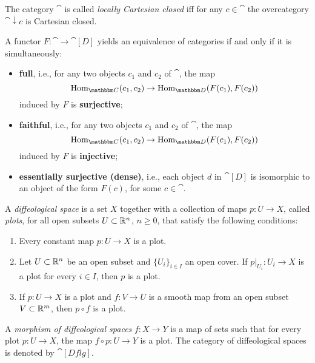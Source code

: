 \documentclass[a4paper,11pt]{article}  %
\newcommand{\Dflg}{\cat[Dflg]}
\begin{document}
\begin{definition}
	The category $\cat$ is called \emph{locally Cartesian closed} iff for any $c \in\cat$ the overcategory $\cat \downarrow c$ is Cartesian closed.
\end{definition}

\begin{definition}
A functor \( F : \cat \to \cat[D] \) yields an equivalence of categories if and only if it is simultaneously:
\begin{itemize}
    \item \textbf{full}, i.e., for any two objects \( c_1 \) and \( c_2 \) of \(\cat\), the map 
    \[
    \Hom_{\cat}(c_1, c_2) \to \Hom_{\cat[D]}(F(c_1), F(c_2))
    \]
    induced by \( F \) is \textbf{surjective};
    
    \item \textbf{faithful}, i.e., for any two objects \( c_1 \) and \( c_2 \) of \(\cat\), the map 
    \[
    \Hom_{\cat}(c_1, c_2) \to \Hom_{\cat[D]}(F(c_1), F(c_2))
    \]
    induced by \( F \) is \textbf{injective};
    
    \item \textbf{essentially surjective (dense)}, i.e., each object \( d \) in \(\cat[D]\) is isomorphic to an object of the form \( F(c) \), for some \( c \in \cat \).
\end{itemize}
\end{definition}

\begin{definition}
A \emph{diffeological space} is a set \( X \) together with a collection of maps \( p : U \to X \), called \emph{plots}, for all open subsets \( U \subset \mathbb{R}^n \), \( n \geq 0 \), that satisfy the following conditions:
\begin{enumerate}
    \item Every constant map \( p : U \to X \) is a plot.
    \item Let \( U \subset \mathbb{R}^n \) be an open subset and \( \{U_i\}_{i \in I} \) an open cover. If \( p|_{U_i} : U_i \to X \) is a plot for every \( i \in I \), then \( p \) is a plot.
    \item If \( p : U \to X \) is a plot and \( f : V \to U \) is a smooth map from an open subset \( V \subset \mathbb{R}^m \), then \( p \circ f \) is a plot.
\end{enumerate}
A \emph{morphism of diffeological spaces} \( f : X \to Y \) is a map of sets such that for every plot \( p : U \to X \), the map \( f \circ p : U \to Y \) is a plot. The category of diffeological spaces is denoted by \( \Dflg \).
\end{definition}


			
			
\end{document}

